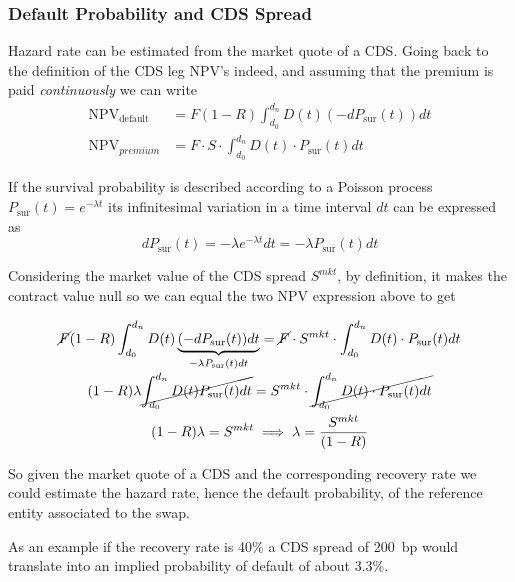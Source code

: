 \subsubsection*{Default Probability and CDS Spread}

Hazard rate can be estimated from the market quote of a CDS. Going back to the definition of the CDS leg NPV's indeed, and assuming that the premium is paid \emph{continuously} we can write
\begin{equation}
  \begin{aligned}
    \mathrm{NPV_{default}} &= F(1-R) \int_{d_0}^{d_n} D(t) (-dP_{\textrm{sur}}(t)) dt \\
    \textrm{NPV}_{premium} &= F\cdot S \cdot \int_{d_0}^{d_n} D(t) \cdot P_{\textrm{sur}}(t) dt 
  \end{aligned}
\end{equation}

If the survival probability is described according to a Poisson process $P_{\textrm{sur}}(t) = e^{−\lambda t}$ its infinitesimal variation in a time interval $dt$ can be expressed as
\begin{equation*}
  dP_{\textrm{sur}}(t) = -\lambda e^{−\lambda t} dt = -\lambda P_{\textrm{sur}}(t) dt 
\end{equation*}

Considering the market value of the CDS spread $S^{mkt}$, by definition, it makes the contract value null so we can equal the two NPV expression above to get

\begin{equation*}
  \begin{gathered}
    \cancel{F}(1-R) \int_{d_0}^{d_n} D(t) \underbrace{(-dP_{\textrm{sur}}(t)) dt}_{-\lambda  P_{\textrm{sur}}(t) dt} =  \cancel{F}\cdot S^{mkt} \cdot \int_{d_0}^{d_n} D(t) \cdot P_{\textrm{sur}}(t) dt \\
    (1-R) \lambda \cancel{\int_{d_0}^{d_n} D(t) P_{\textrm{sur}}(t) dt} =  S^{mkt} \cdot \cancel{\int_{d_0}^{d_n} D(t) \cdot P_{\textrm{sur}}(t) dt} \\
    (1-R) \lambda = S^{mkt} \implies  \lambda = \frac{ S^{mkt}}{(1-R)}
  \end{gathered}
\end{equation*}

So given the market quote of a CDS and the corresponding recovery rate we could estimate the hazard rate, hence the default probability, of the reference entity associated to the swap.

As an example if the recovery rate is 40\% a CDS spread of 200~bp would translate into an implied probability of default of about 3.3\%.

